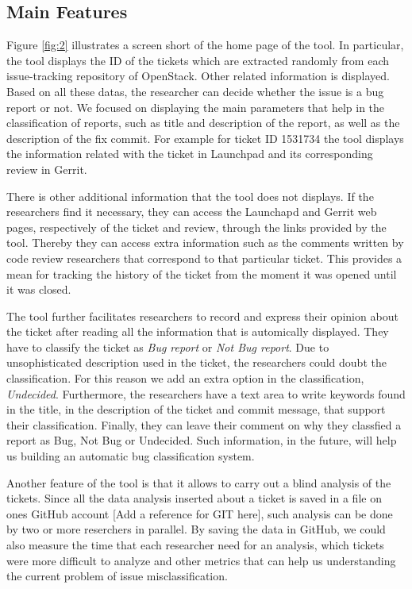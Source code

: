 \documentclass[runningheads,a4paper]{llncs}
\begin{document}
\subsection{Main Features}
\label{sec:2.2}
Figure \ref{fig:2} illustrates a screen short of the home page of the tool. In particular, the tool displays the ID of the tickets which are extracted randomly from each issue-tracking repository of OpenStack. Other related information is displayed. Based on all these datas, the researcher can decide whether the issue is a bug report or not. We focused on displaying the main parameters that help in the classification of reports, such as title and description of the report, as well as the description of the fix commit. For example for ticket ID 1531734 the tool displays the information related with the ticket in Launchpad and its corresponding review in Gerrit.

There is other additional information that the tool does not displays. If the researchers find it necessary, they can access the Launchapd and Gerrit web pages, respectively of the ticket and review, through the links provided by the tool. Thereby they can access extra information such as the comments written by code review researchers that correspond to that particular ticket. This provides a mean for tracking the history of the ticket from the moment it was opened until it was closed.

The tool further facilitates researchers to record and express their opinion about the ticket after reading all the information that is automically displayed. They have to classify the ticket as \textit{Bug report} or \textit{Not Bug report}. Due to unsophisticated description used in the ticket, the researchers could doubt the classification. For this reason we add an extra option in the classification, \textit{Undecided}. Furthermore, the researchers have a text area to write keywords found in the title, in the description of the ticket and commit message, that support their classification.
Finally, they can leave their comment on why they classfied a report as Bug, Not Bug or Undecided. Such information, in the future, will help us building an automatic bug classification system.

Another feature of the tool is that it allows to carry out a blind analysis of the tickets. Since all the data analysis inserted about a ticket is saved in a file on ones GitHub account [Add a reference for GIT here], such analysis can be done by two or more reserchers in parallel. By saving the data in GitHub, we could also measure the time that each researcher need for an analysis, which tickets were more difficult to analyze and other metrics that can help us understanding the current problem of issue misclassification.
\end{document}
